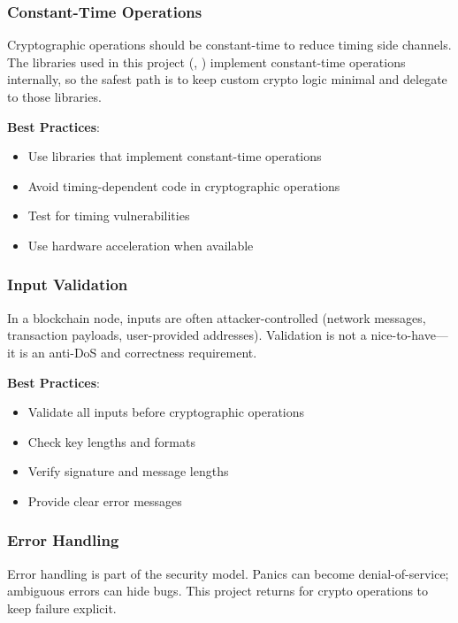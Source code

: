\subsubsection{Constant-Time Operations}
\label{sec:ch08-constant-time}

Cryptographic operations should be constant-time to reduce timing side channels. The libraries used in this project (, ) implement constant-time operations internally, so the safest path is to keep custom crypto logic minimal and delegate to those libraries.

\textbf{Best Practices}:
\begin{itemize}
  \item Use libraries that implement constant-time operations
  \item Avoid timing-dependent code in cryptographic operations
  \item Test for timing vulnerabilities
  \item Use hardware acceleration when available
\end{itemize}

\subsubsection{Input Validation}
\label{sec:ch08-input-validation}

In a blockchain node, inputs are often attacker-controlled (network messages, transaction payloads, user-provided addresses). Validation is not a nice-to-have---it is an anti-DoS and correctness requirement.

\textbf{Best Practices}:
\begin{itemize}
  \item Validate all inputs before cryptographic operations
  \item Check key lengths and formats
  \item Verify signature and message lengths
  \item Provide clear error messages
\end{itemize}

\subsubsection{Error Handling}
\label{sec:ch08-error-handling}

Error handling is part of the security model. Panics can become denial-of-service; ambiguous errors can hide bugs. This project returns  for crypto operations to keep failure explicit.

